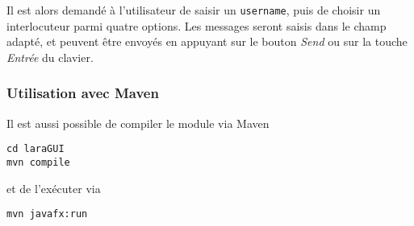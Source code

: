 \documentclass[10pt,a4paper]{article}
\begin{document}
Il est alors demandé à l'utilisateur de saisir un \texttt{username}, puis de choisir un interlocuteur parmi quatre options. Les messages seront saisis dans le champ adapté, et peuvent être envoyés en appuyant sur le bouton \textit{Send} ou sur la touche \textit{Entrée} du clavier.

\subsubsection{Utilisation avec Maven}
Il est aussi possible de compiler le module via Maven
\begin{center}
\texttt{cd laraGUI} \\
\texttt{mvn compile}
\end{center}
et de l'exécuter via
\begin{center}
\texttt{mvn javafx:run}
\end{center}
\end{document}
